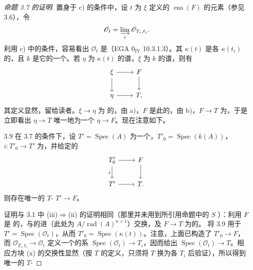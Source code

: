 \begin{proof}[命题 3.7 的证明]
置身于 c) 的条件中，设 $t$ 为 $\xi$ 定义的 $\operatorname{ens}(F)$ 的元素（参见 3.6），令
\[\mathscr O_t=\varinjlim_i\mathscr O_{T_i,t_i}.\]
利用 c) 中的条件，容易看出 $\mathscr O_t$ 是（EGA $0_{\mathrm{IV}}$ 10.3.1.3）。其 $\kappa(t)$ 是各 $\kappa(t_i)$ 的，且 $k$ 是它的一个。若 $\eta$ 为 $\kappa(t)$ 的谱，$\xi$ 为 $k$ 的谱，则有
\[\begin{tikzcd}\xi\arrow[r]\arrow[d]&F\arrow[d]\\\eta\arrow[r]&T,\end{tikzcd}\]
其定义显然，留给读者。$\xi\to\eta$ 为 的，由 a)，$F$ 是此的，由 b)，$F\to T$ 为，于是立即看出 $\eta\to T$ 唯一地为一个 $\eta\to F$。现在注意如下。
\begin{SGAresult}{}{3.9}
在 3.7 的条件下，设 $T'=\operatorname{Spec}(A)$ 为一个，$T'_0=\operatorname{Spec}(k(A))$，$i:T'_0\to T'$ 为，并给定的
\[\begin{tikzcd}T'_0\arrow[r]\arrow[d,"i"']&F\arrow[d]\\T'\arrow[r]&T.\end{tikzcd}\]
则存在唯一的 $T$- $T'\to F$。
\end{SGAresult}
证明与 3.1 中 (iii)$\Rightarrow$(ii) 的证明相同（那里并未用到所引用命题中的 $S$ ）：利用 $F$ 是 的，与的进（此处为 $A/\operatorname{rad}(A)^{n+1}$）交换，及 $F\to T$ 为的。
将 3.9 用于 $T'=\operatorname{Spec}(\mathscr O_t)$，从而 $T'_0=\operatorname{Spec}(\kappa(t))$。注意，上面已构造了 $T'_0\to F$，而 $\mathscr O_{T_i,t_i}\to\mathscr O_t$ 定义一个的系 $\operatorname{Spec}(\mathscr O_t)\to T_i$，因而给出 $\operatorname{Spec}(\mathscr O_t)\to T$。相应方块 (x) 的交换性显然（按 $T$ 的定义，只须将 $T$ 换为各 $T_i$ 后验证），所以得到唯一的 $T$-

\end{proof}
